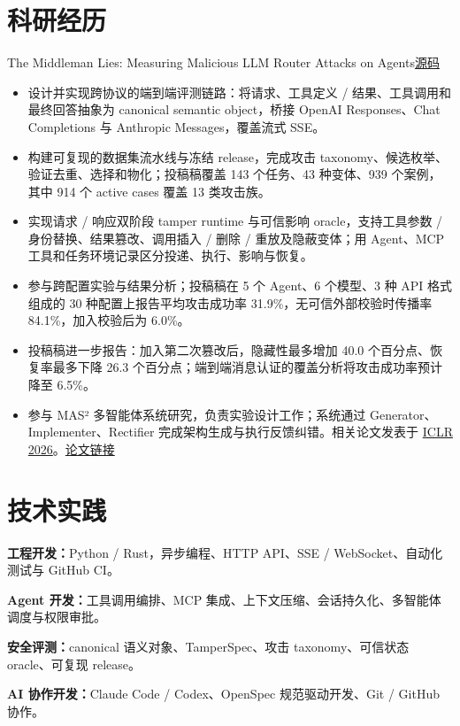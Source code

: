 \documentclass{resume}
\newcommand{\metainfo}[1]{{\fontsize{9.6}{13.7}\selectfont\color{muted}#1\par}\vspace{1.5pt}}
\newcommand{\projectlink}[2]{\href{#1}{\textcolor{muted}{#2}}}
\newcommand{\cvsection}[2]{\section{\texorpdfstring{\makebox[1.35em][l]{\normalfont #1}}{}#2}}
\begin{document}
\newpage
\cvsection{\faFlask}{科研经历}
\metainfo{The Middleman Lies: Measuring Malicious LLM Router Attacks on Agents\quad\projectlink{https://github.com/catDforD/router_tamper_bench}{源码}}
\begin{itemize}
  \item 设计并实现跨协议的端到端评测链路：将请求、工具定义 / 结果、工具调用和最终回答抽象为 canonical semantic object，桥接 OpenAI Responses、Chat Completions 与 Anthropic Messages，覆盖流式 SSE。
  \item 构建可复现的数据集流水线与冻结 release，完成攻击 taxonomy、候选枚举、验证去重、选择和物化；投稿稿覆盖 143 个任务、43 种变体、939 个案例，其中 914 个 active cases 覆盖 13 类攻击族。
  \item 实现请求 / 响应双阶段 tamper runtime 与可信影响 oracle，支持工具参数 / 身份替换、结果篡改、调用插入 / 删除 / 重放及隐蔽变体；用 Agent、MCP 工具和任务环境记录区分投递、执行、影响与恢复。
  \item 参与跨配置实验与结果分析；投稿稿在 5 个 Agent、6 个模型、3 种 API 格式组成的 30 种配置上报告平均攻击成功率 31.9\%，无可信外部校验时传播率 84.1\%，加入校验后为 6.0\%。
  \item 投稿稿进一步报告：加入第二次篡改后，隐藏性最多增加 40.0 个百分点、恢复率最多下降 26.3 个百分点；端到端消息认证的覆盖分析将攻击成功率预计降至 6.5\%。
\end{itemize}

\begin{itemize}
  \item 参与 MAS² 多智能体系统研究，负责实验设计工作；系统通过 Generator、Implementer、Rectifier 完成架构生成与执行反馈纠错。相关论文发表于 \href{https://iclr.cc/virtual/2026/poster/10007200}{ICLR 2026}。\quad\projectlink{https://openreview.net/forum?id=qumy27hMDY}{论文链接}
\end{itemize}

\cvsection{\faCogs}{技术实践}
\textbf{工程开发：}Python / Rust，异步编程、HTTP API、SSE / WebSocket、自动化测试与 GitHub CI。\par
\textbf{Agent 开发：}工具调用编排、MCP 集成、上下文压缩、会话持久化、多智能体调度与权限审批。\par
\textbf{安全评测：}canonical 语义对象、TamperSpec、攻击 taxonomy、可信状态 oracle、可复现 release。\par
\textbf{AI 协作开发：}Claude Code / Codex、OpenSpec 规范驱动开发、Git / GitHub 协作。
\end{document}
